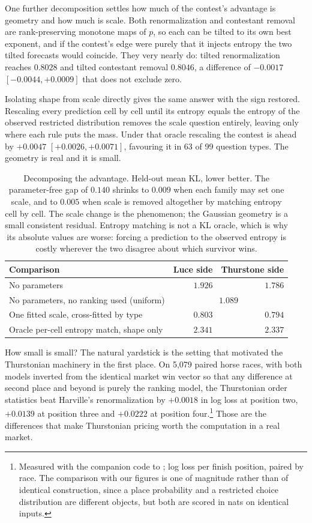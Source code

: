 \documentclass[11pt]{article}
\begin{document}
One further decomposition settles how much of the contest's advantage is
geometry and how much is scale. Both renormalization and contestant removal are
rank-preserving monotone maps of $p$, so each can be tilted to its own best
exponent, and if the contest's edge were purely that it injects entropy the two
tilted forecasts would coincide. They very nearly do: tilted renormalization
reaches $0.8028$ and tilted contestant removal $0.8046$, a difference of
$-0.0017$ $[-0.0044, +0.0009]$ that does not exclude zero.

Isolating shape from scale directly gives the same answer with the sign
restored. Rescaling every prediction cell by cell until its entropy equals the
entropy of the observed restricted distribution removes the scale question
entirely, leaving only where each rule puts the mass. Under that oracle
rescaling the contest is ahead by $+0.0047$ $[+0.0026, +0.0071]$, favouring it
in 63 of 99 question types. The geometry is real and it is small.

\begin{table}[ht]
\centering
\small
\begin{tabular}{lrr}
\toprule
Comparison & Luce side & Thurstone side \\
\midrule
No parameters & $1.926$ & $\mathbf{1.786}$ \\
No parameters, no ranking used (uniform) & \multicolumn{2}{c}{$1.089$} \\
One fitted scale, cross-fitted by type & $0.803$ & $\mathbf{0.794}$ \\
Oracle per-cell entropy match, shape only & $2.341$ & $\mathbf{2.337}$ \\
\bottomrule
\end{tabular}
\caption{Decomposing the advantage. Held-out mean KL, lower better. The
parameter-free gap of $0.140$ shrinks to $0.009$ when each family may set one
scale, and to $0.005$ when scale is removed altogether by matching entropy cell
by cell. The scale change is the phenomenon; the Gaussian geometry is a small
consistent residual. Entropy matching is not a KL oracle, which is why its
absolute values are worse: forcing a prediction to the observed entropy is
costly wherever the two disagree about which survivor wins.}
\label{tab:decomp}
\end{table}

How small is small? The natural yardstick is the setting that motivated the
Thurstonian machinery in the first place. On 5{,}079 paired horse races, with
both models inverted from the identical market win vector so that any
difference at second place and beyond is purely the ranking model, the
Thurstonian order statistics beat Harville's renormalization by $+0.0018$ in
log loss at position two, $+0.0139$ at position three and $+0.0222$ at position
four.\footnote{Measured with the companion code to \cite{cotton2021}; log loss
per finish position, paired by race. The comparison with our figures is one of
magnitude rather than of identical construction, since a place probability and
a restricted choice distribution are different objects, but both are scored in
nats on identical inputs.} Those are the differences that make Thurstonian
pricing worth the computation in a real market.
\end{document}
